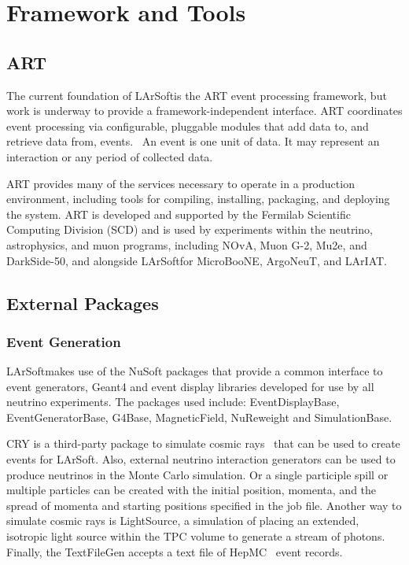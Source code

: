 \documentclass[12pt]{elsarticle}
\newcommand{\larsoft}{LArSoft}
\begin{document}
\hspace*{2cm}
\begin{figure}[h]
\centering
\label{bubble}
\end{figure}

\section{Framework and Tools}
\subsection{ART}
The current foundation of \larsoft is the ART event processing framework, but work is underway to provide a framework-independent interface. ART coordinates event processing via configurable, pluggable modules that add data to, and retrieve data from, events.~\cite{art-ref}  An event is one unit of data. It may represent an interaction or any period of collected data.

ART provides many of the services necessary to operate in a production environment, including tools for compiling, installing, packaging, and deploying the system.  ART is developed and supported by the Fermilab Scientific Computing Division (SCD) and is used by experiments within the neutrino, astrophysics, and muon programs, including NOvA, Muon G-2, Mu2e, and DarkSide-50, and alongside \larsoft for MicroBooNE, ArgoNeuT, and LArIAT.

\subsection{External Packages}
\subsubsection{Event Generation}
\larsoft makes use of the NuSoft packages that provide a common interface to event generators, Geant4 and event display libraries developed for use by all neutrino experiments. The packages used include: EventDisplayBase, EventGeneratorBase, G4Base, MagneticField, NuReweight and SimulationBase.

CRY is a third-party package to simulate cosmic rays~\cite{cry} that can be used to create events for \larsoft.  Also, external neutrino interaction generators can be used to produce neutrinos in the Monte Carlo simulation. Or a single participle spill or multiple particles can be created with the initial position, momenta, and the spread of momenta and starting positions specified in the job file. Another way to simulate cosmic rays is LightSource, a simulation of placing an extended, isotropic light source within the TPC volume to generate a stream of photons. Finally, the TextFileGen accepts a text file of HepMC~\cite{hepmc} event records.
\end{document}
